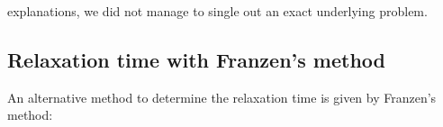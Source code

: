 \documentclass{article}
\begin{document}
explanations, we did not manage to single out an exact underlying problem.
\subsection{Relaxation time with Franzen’s method}
An alternative method to determine the relaxation time is given by Franzen’s method:
\end{document}
